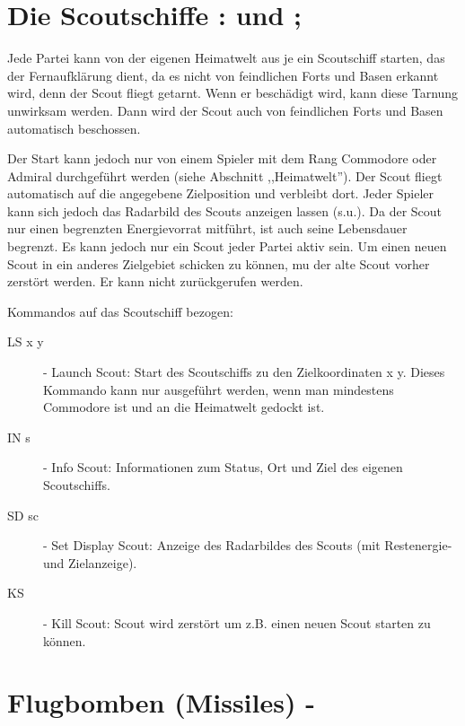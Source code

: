 \section{Die Scoutschiffe : und ;}

Jede Partei kann von der eigenen Heimatwelt aus je ein Scoutschiff starten,
das der Fernaufkl\"arung dient, da es nicht von feindlichen Forts und Basen
erkannt wird, denn der Scout fliegt getarnt. Wenn er besch\"adigt wird,
kann diese Tarnung unwirksam werden. Dann wird der Scout auch von 
feindlichen Forts und Basen automatisch beschossen.

Der Start kann jedoch nur von einem Spieler mit dem Rang Commodore oder
Admiral durchgef\"uhrt werden (siehe Abschnitt ,,Heimatwelt''). Der
Scout fliegt automatisch auf die angegebene Zielposition und verbleibt dort.
Jeder Spieler kann sich jedoch das Radarbild des Scouts anzeigen lassen
(s.u.). Da der Scout nur einen
begrenzten Energievorrat mitf\"uhrt, ist auch seine Lebensdauer begrenzt.
Es kann jedoch nur ein Scout jeder Partei aktiv sein. Um einen neuen
Scout in ein anderes Zielgebiet schicken zu k\"onnen, mu\3 der alte
Scout vorher zerst\"ort werden. Er kann nicht zur\"uckgerufen werden.

Kommandos auf das Scoutschiff bezogen:
\begin{description}
\item [LS x y] - Launch Scout: Start des Scoutschiffs zu den Zielkoordinaten
                 x y. Dieses Kommando kann nur ausgef\"uhrt werden, wenn man
                 mindestens Commodore ist und an die Heimatwelt gedockt ist.
\item [IN s] - Info Scout: Informationen zum Status, Ort und Ziel des eigenen
               Scoutschiffs.
\item [SD sc] - Set Display Scout: Anzeige des Radarbildes des Scouts (mit
                Restenergie- und Zielanzeige).
\item [KS] - Kill Scout: Scout wird zerst\"ort um z.B. einen neuen Scout
             starten zu k\"onnen.
\end{description}

\section{Flugbomben (Missiles) -}

